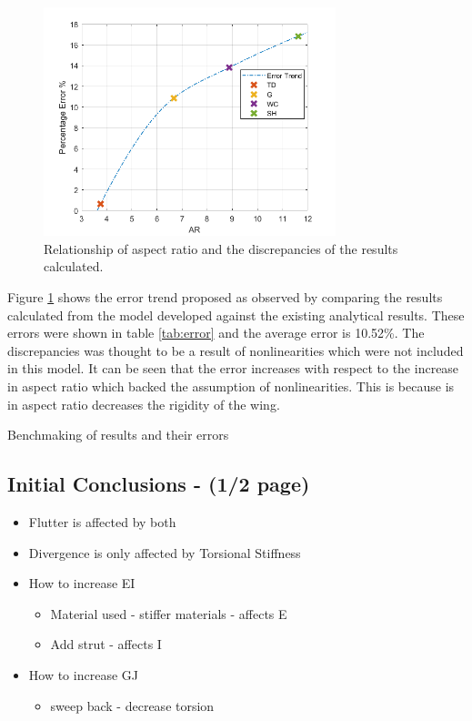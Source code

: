 \documentclass[11pt]{article}
\begin{document}
\begin{figure}
    \centering
    \includegraphics[width = 8.5cm]{figures/error-trend.png}
    \caption{Relationship of aspect ratio and the discrepancies of the results calculated.}
    \label{fig:error}
\end{figure}

Figure \ref{fig:error} shows the error trend proposed as observed by comparing the results calculated from the model developed against the existing analytical results. These errors were shown in table \ref{tab:error} and the average error is 10.52\%. The discrepancies was thought to be a result of nonlinearities which were not included in this model. It can be seen that the error increases with respect to the increase in aspect ratio which backed the assumption of nonlinearities. This is because is in aspect ratio decreases the rigidity of the wing.

\begin{table}[H]
    \centering
    \caption{Benchmaking of results and their errors}
    
    \label{tab:error}
\end{table}

\subsection{Initial Conclusions - (1/2 page)}
\begin{itemize}
    \item Flutter is affected by both
    \item Divergence is only affected by Torsional Stiffness
    \item How to increase EI
    \begin{itemize}
        \item Material used - stiffer materials - affects E
        \item Add strut - affects I
    \end{itemize}
    \item How to increase GJ
    \begin{itemize}
        \item sweep back - decrease torsion
    \end{itemize}
\end{itemize}
\end{document}
